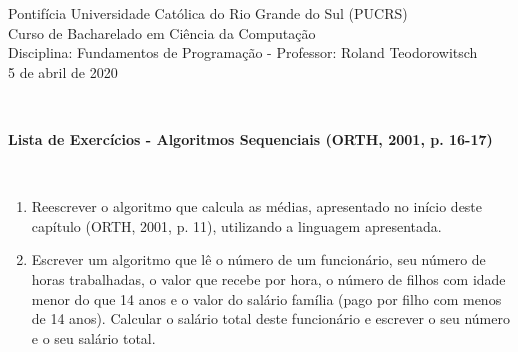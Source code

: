 \documentclass[onecolumn,a4paper,10pt]{report}
\newcommand{\+}{\, + \,}
\newcommand{\<}{\hspace*{-0.4cm}}
\begin{document}
\singlespacing

\begin{center}
Pontifícia Universidade Católica do Rio Grande do Sul (PUCRS)\\
Curso de Bacharelado em Ciência da Computação\\
Disciplina: Fundamentos de Programação - Professor: Roland Teodorowitsch\\
5 de abril de 2020
\end{center}
~\\

\begin{center}
\textbf{Lista de Exercícios - Algoritmos Sequenciais (ORTH, 2001, p. 16-17)}
\end{center}
~\\

\begin{enumerate}[1.]

\item Reescrever o algoritmo que calcula as médias, apresentado no início deste capítulo (ORTH, 2001, p. 11), utilizando a linguagem apresentada.\\

\item Escrever um algoritmo que lê o número de um funcionário, seu número de horas trabalhadas, o valor que recebe por hora, o número de filhos com idade menor do que 14 anos e o valor do salário família (pago por filho com menos de 14 anos). Calcular o salário total deste funcionário e escrever o seu número e o seu salário total.


\end{enumerate}
\end{document}
